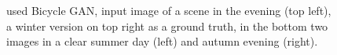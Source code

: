 \documentclass[final,3p,twocolumn,authoryear,sort&compress,times]{maia}
\begin{document}
\begin{figure}[h]
    \centering{
    \def\svgwidth{\linewidth}
    }
    \caption{\citet{bicycle} used Bicycle GAN, input image of a scene in the evening (top left), a winter version on top right as a ground truth, in the bottom two images in a clear summer day (left) and autumn evening (right).  }
\end{figure}
\end{document}
